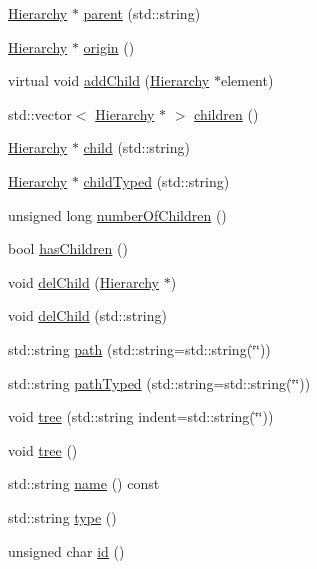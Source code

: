 \begin{DoxyCompactItemize}
\item 
\hyperlink{classHierarchy}{Hierarchy} $\ast$ \hyperlink{classHierarchy_ad550588733bf75ac5c0fcfd7c8fd11a6}{parent} (std::string)
\item 
\hyperlink{classHierarchy}{Hierarchy} $\ast$ \hyperlink{classHierarchy_aee461dc930ce3871636ff87f075b1b83}{origin} ()
\item 
virtual void \hyperlink{classHierarchy_ad677774ff38fcb257c04a3a10d471fac}{addChild} (\hyperlink{classHierarchy}{Hierarchy} $\ast$element)
\item 
std::vector$<$ \hyperlink{classHierarchy}{Hierarchy} $\ast$ $>$ \hyperlink{classHierarchy_aa9a76f69e98e052ee1a6e32cea006288}{children} ()
\item 
\hyperlink{classHierarchy}{Hierarchy} $\ast$ \hyperlink{classHierarchy_a1e207f973c694b538bf90107b4868817}{child} (std::string)
\item 
\hyperlink{classHierarchy}{Hierarchy} $\ast$ \hyperlink{classHierarchy_a0c15a5276a3b80b4354d6bd8a01e0708}{childTyped} (std::string)
\item 
unsigned long \hyperlink{classHierarchy_ab16e84de65fd84e14001a6cf941c8be4}{numberOfChildren} ()
\item 
bool \hyperlink{classHierarchy_a255174fe4d316d2a3f430dcb9dab29f1}{hasChildren} ()
\item 
void \hyperlink{classHierarchy_a2b2b359fac003233f65786a616766bde}{delChild} (\hyperlink{classHierarchy}{Hierarchy} $\ast$)
\item 
void \hyperlink{classHierarchy_a1928ac7615fe0b5e55cd707f70dc6781}{delChild} (std::string)
\item 
std::string \hyperlink{classHierarchy_aa7990fa7caf132d83e361ce033c6c65a}{path} (std::string=std::string(\char`\"{}\char`\"{}))
\item 
std::string \hyperlink{classHierarchy_a1efd56cd164d328d2002e53a10a19b8c}{pathTyped} (std::string=std::string(\char`\"{}\char`\"{}))
\item 
void \hyperlink{classHierarchy_a76e914b9a677a22a82deb74d892bf261}{tree} (std::string indent=std::string(\char`\"{}\char`\"{}))
\item 
void \hyperlink{classHierarchy_a594c294c5f60c230e106d522ed008212}{tree} ()
\item 
std::string \hyperlink{classObject_a975e888d50bfcbffda2c86368332a5cd}{name} () const 
\item 
std::string \hyperlink{classObject_a84f99f70f144a83e1582d1d0f84e4e62}{type} ()
\item 
unsigned char \hyperlink{classObject_af99145335cc61ff6e2798ea17db009d2}{id} ()

\end{DoxyCompactItemize}
